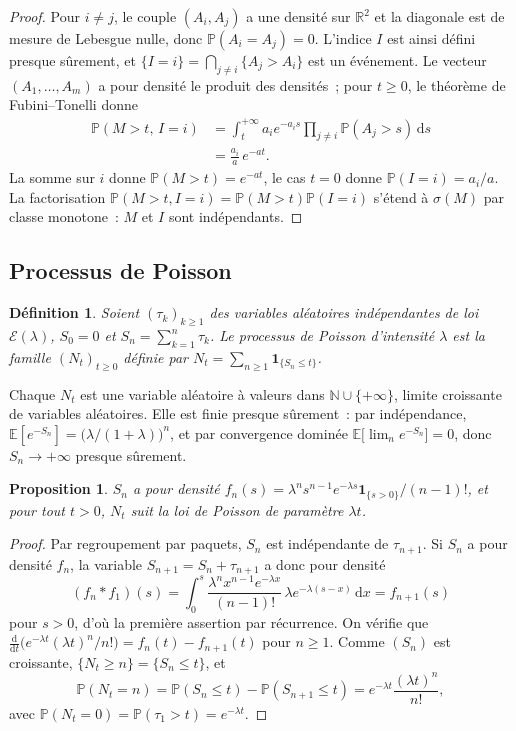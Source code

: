 \documentclass[10pt,a4paper,twocolumn]{article}
\theoremstyle{enonce}
\newtheorem{proposition}[theoreme]{Proposition}
\theoremstyle{defi}
\newtheorem{definition}[theoreme]{Définition}
\newcommand{\PP}{\mathbb{P}}
\newcommand{\EE}{\mathbb{E}}
\newcommand{\dd}{\mathrm{d}}
\newcommand{\un}{\mathbf{1}}
\begin{document}
\begin{proof}
Pour $i\neq j$, le couple $(A_i,A_j)$ a une densité sur $\mathbb{R}^2$ et la diagonale est de mesure de Lebesgue nulle, donc $\PP(A_i=A_j)=0$. L'indice $I$ est ainsi défini presque sûrement, et $\{I=i\}=\bigcap_{j\neq i}\{A_j>A_i\}$ est un événement. Le vecteur $(A_1,\dots,A_m)$ a pour densité le produit des densités~; pour $t\geq0$, le théorème de Fubini--Tonelli donne
\begin{align*}
\PP(M>t,\,I=i)&=\int_t^{+\infty}a_ie^{-a_is}\prod_{j\neq i}\PP(A_j>s)\,\dd s\\
&=\frac{a_i}{a}\,e^{-at}.
\end{align*}
La somme sur $i$ donne $\PP(M>t)=e^{-at}$, le cas $t=0$ donne $\PP(I=i)=a_i/a$. La factorisation $\PP(M>t,I=i)=\PP(M>t)\PP(I=i)$ s'étend à $\sigma(M)$ par classe monotone~: $M$ et $I$ sont indépendants.
\end{proof}

\subsection{Processus de Poisson}

\begin{definition}
Soient $(\tau_k)_{k\geq1}$ des variables aléatoires indépendantes de loi $\mathcal{E}(\lambda)$, $S_0=0$ et $S_n=\sum_{k=1}^n\tau_k$. Le \emph{processus de Poisson} d'intensité $\lambda$ est la famille $(N_t)_{t\geq0}$ définie par $N_t=\sum_{n\geq1}\un_{\{S_n\leq t\}}$.
\end{definition}

Chaque $N_t$ est une variable aléatoire à valeurs dans $\mathbb{N}\cup\{+\infty\}$, limite croissante de variables aléatoires. Elle est finie presque sûrement~: par indépendance, $\EE[e^{-S_n}]=\big(\lambda/(1+\lambda)\big)^n$, et par convergence dominée $\EE\big[\lim_ne^{-S_n}\big]=0$, donc $S_n\to+\infty$ presque sûrement.

\begin{proposition}\label{prop:poisson}
$S_n$ a pour densité $f_n(s)=\lambda^ns^{n-1}e^{-\lambda s}\un_{\{s>0\}}/(n-1)!$, et pour tout $t>0$, $N_t$ suit la loi de Poisson de paramètre $\lambda t$.
\end{proposition}

\begin{proof}
Par regroupement par paquets, $S_n$ est indépendante de $\tau_{n+1}$. Si $S_n$ a pour densité $f_n$, la variable $S_{n+1}=S_n+\tau_{n+1}$ a donc pour densité
\[
(f_n*f_1)(s)=\int_0^s\frac{\lambda^nx^{n-1}e^{-\lambda x}}{(n-1)!}\,\lambda e^{-\lambda(s-x)}\,\dd x=f_{n+1}(s)
\]
pour $s>0$, d'où la première assertion par récurrence. On vérifie que $\frac{\dd}{\dd t}\big(e^{-\lambda t}(\lambda t)^n/n!\big)=f_n(t)-f_{n+1}(t)$ pour $n\geq1$. Comme $(S_n)$ est croissante, $\{N_t\geq n\}=\{S_n\leq t\}$, et
\[
\PP(N_t=n)=\PP(S_n\leq t)-\PP(S_{n+1}\leq t)=e^{-\lambda t}\frac{(\lambda t)^n}{n!},
\]
avec $\PP(N_t=0)=\PP(\tau_1>t)=e^{-\lambda t}$.
\end{proof}
\end{document}
